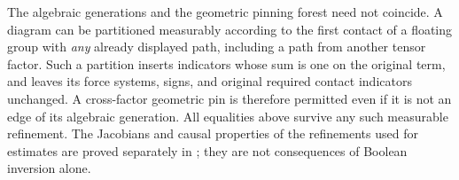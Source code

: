 The algebraic generations and the geometric pinning forest
need not coincide.  A diagram can be partitioned measurably according
to the first contact of a floating group with \emph{any} already
displayed path, including a path from another tensor factor.  Such
a partition inserts indicators whose sum is one on the original
term, and leaves its force systems, signs, and original required
contact indicators unchanged.  A cross-factor geometric pin is
therefore permitted even if it is not an edge of its algebraic
generation.  All equalities above survive any such measurable
refinement.  The Jacobians and causal properties of the refinements
used for estimates are proved separately in
; they are not consequences of
Boolean inversion alone.
